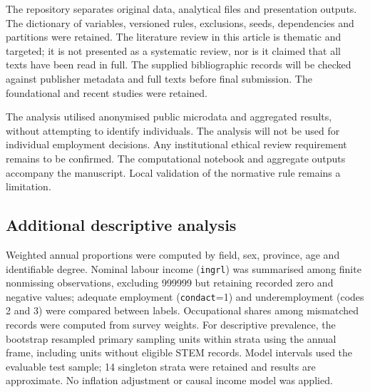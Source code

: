 The repository separates original data, analytical files and presentation outputs. The dictionary of variables, versioned rules, exclusions, seeds, dependencies and partitions were retained. The literature review in this article is thematic and targeted; it is not presented as a systematic review, nor is it claimed that all texts have been read in full. The supplied bibliographic records will be checked against publisher metadata and full texts before final submission. The foundational and recent studies were retained.

The analysis utilised anonymised public microdata and aggregated results, without attempting to identify individuals. The analysis will not be used for individual employment decisions. Any institutional ethical review requirement remains to be confirmed. The computational notebook and aggregate outputs accompany the manuscript. Local validation of the normative rule remains a limitation. 
\subsection{Additional descriptive analysis}
Weighted annual proportions were computed by field, sex, province, age and identifiable degree. Nominal labour income (\texttt{ingrl}) was summarised among finite nonmissing observations, excluding 999999 but retaining recorded zero and negative values; adequate employment (\texttt{condact}=1) and underemployment (codes 2 and 3) were compared between labels. Occupational shares among mismatched records were computed from survey weights. For descriptive prevalence, the bootstrap resampled primary sampling units within strata using the annual frame, including units without eligible STEM records. Model intervals used the evaluable test sample; 14 singleton strata were retained and results are approximate. No inflation adjustment or causal income model was applied.
